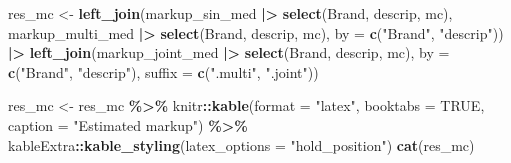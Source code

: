 \documentclass[
]{article}
\newenvironment{Shaded}{\begin{snugshade}}{\end{snugshade}}
\newcommand{\AttributeTok}[1]{\textcolor[rgb]{0.13,0.29,0.53}{#1}}
\newcommand{\ConstantTok}[1]{\textcolor[rgb]{0.56,0.35,0.01}{#1}}
\newcommand{\FunctionTok}[1]{\textcolor[rgb]{0.13,0.29,0.53}{\textbf{#1}}}
\newcommand{\NormalTok}[1]{#1}
\newcommand{\OtherTok}[1]{\textcolor[rgb]{0.56,0.35,0.01}{#1}}
\newcommand{\SpecialCharTok}[1]{\textcolor[rgb]{0.81,0.36,0.00}{\textbf{#1}}}
\newcommand{\StringTok}[1]{\textcolor[rgb]{0.31,0.60,0.02}{#1}}
\begin{document}
\begin{Shaded}
\begin{Highlighting}[]
\NormalTok{res\_mc }\OtherTok{\textless{}{-}} \FunctionTok{left\_join}\NormalTok{(markup\_sin\_med }\SpecialCharTok{|\textgreater{}} \FunctionTok{select}\NormalTok{(Brand, descrip, mc),}
\NormalTok{                        markup\_multi\_med }\SpecialCharTok{|\textgreater{}} \FunctionTok{select}\NormalTok{(Brand, descrip, mc),}
                        \AttributeTok{by =} \FunctionTok{c}\NormalTok{(}\StringTok{"Brand"}\NormalTok{, }\StringTok{"descrip"}\NormalTok{)) }\SpecialCharTok{|\textgreater{}}
                \FunctionTok{left\_join}\NormalTok{(markup\_joint\_med }\SpecialCharTok{|\textgreater{}} \FunctionTok{select}\NormalTok{(Brand, descrip, mc),}
                          \AttributeTok{by =} \FunctionTok{c}\NormalTok{(}\StringTok{"Brand"}\NormalTok{, }\StringTok{"descrip"}\NormalTok{), }\AttributeTok{suffix =} \FunctionTok{c}\NormalTok{(}\StringTok{".multi"}\NormalTok{, }\StringTok{".joint"}\NormalTok{))}

\NormalTok{res\_mc }\OtherTok{\textless{}{-}}\NormalTok{ res\_mc }\SpecialCharTok{\%\textgreater{}\%}
\NormalTok{  knitr}\SpecialCharTok{::}\FunctionTok{kable}\NormalTok{(}\AttributeTok{format =} \StringTok{"latex"}\NormalTok{, }\AttributeTok{booktabs =} \ConstantTok{TRUE}\NormalTok{, }\AttributeTok{caption =} \StringTok{"Estimated markup"}\NormalTok{) }\SpecialCharTok{\%\textgreater{}\%}
\NormalTok{  kableExtra}\SpecialCharTok{::}\FunctionTok{kable\_styling}\NormalTok{(}\AttributeTok{latex\_options =} \StringTok{"hold\_position"}\NormalTok{)}
\FunctionTok{cat}\NormalTok{(res\_mc)}
\end{Highlighting}
\end{Shaded}
\end{document}

